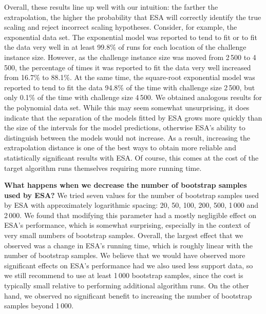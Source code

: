 \documentclass[aic]{iosart2x}
\begin{document}
Overall, these results line up well with our intuition: the farther the extrapolation, the higher the probability that ESA will correctly identify the true scaling and reject incorrect scaling hypotheses. 
Consider, for example, the exponential data set. The exponential model was reported to tend to fit or to fit the data very well in at least 99.8\% of runs for each location of the challenge instance size. 
However, as the challenge instance size was moved from 2\,500 to 4\,500, the percentage of times it was reported to fit the data very well increased from 16.7\% to 88.1\%. 
At the same time, the square-root exponential model was reported to tend to fit the data 94.8\% of the time with challenge size 2\,500, but only 0.1\% of the time with challenge size 4\,500. 
We obtained analogous results for the polynomial data set. 
While this may seem somewhat unsurprising, it does indicate that the separation of the models fitted by ESA grows more quickly than the size of the intervals for the model predictions, otherwise ESA's ability to distinguish between the models would not increase. 
As a result, increasing the extrapolation distance is one of the best ways to obtain more reliable and statistically significant results with ESA. 
Of course, this comes at the cost of the target algorithm runs themselves requiring more running time. 

\textbf{What happens when we decrease the number of bootstrap samples used by ESA?}
We tried seven values for the number of bootstrap samples used by ESA with approximately logarithmic spacing: 20, 50, 100, 200, 500, 1\,000 and 2\,000. We found that modifying this parameter had a mostly negligible effect on ESA's performance, which is somewhat surprising, especially in the context of very small numbers of bootstrap samples. Overall, the largest effect that we observed was a change in ESA's running time, which is roughly linear with the number of bootstrap samples. 
We believe that we would have observed more significant effects on ESA's performance had we also used less support data, so we still recommend to use at least 1\,000 bootstrap samples, since the cost is typically small relative to performing additional algorithm runs. 
On the other hand, we observed no significant benefit to increasing the number of bootstrap samples beyond 1\,000.
\end{document}
